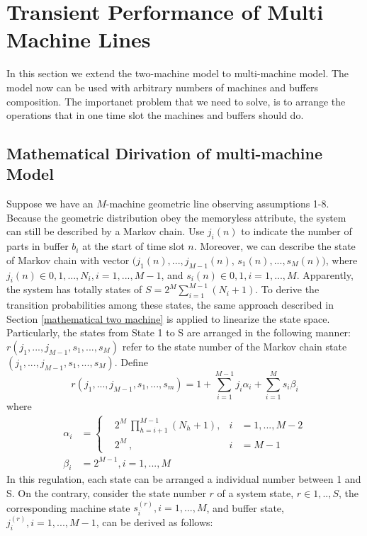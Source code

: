 \section{Transient Performance of Multi Machine Lines}
\noindent In this section we extend the two-machine model to multi-machine model. The model now can be used with arbitrary numbers of machines and buffers composition. The importanet problem that we need to solve, is to arrange the operations that in one time slot the machines and buffers should do.

\subsection{Mathematical Dirivation of multi-machine Model}
\noindent Suppose we have an $M$-machine geometric line observing assumptions 1-8. Because the geometric distribution obey the memoryless attribute, the system can still be described by a Markov chain. Use $j_i(n)$ to indicate the number of parts in buffer $b_i$ at the start of time slot $n$. Moreover, we can describe the state of Markov chain with vector $(j_1(n), ... , j_{M-1}(n)$, $ s_1(n), ..., s_M(n))$, where $j_i(n) \in {0, 1, ...,N_i}, i = 1, ..., M-1$, and $s_i(n) \in {0, 1}, i = 1, ..., M$. Apparently, the system has totally states of $S = 2^M \sum^{M-1}_{i=1} (N_i + 1)$. To derive the transition probabilities among these states, the same approach described in Section \ref{mathematical two machine} is applied to linearize the state space. Particularly, the states from State 1 to S are arranged in the following manner: $r(j_1, ..., j_{M-1}, s_1, ..., s_M)$ refer to the state number of the Markov chain state $(j_1, ..., j_{M-1}, s_1, ..., s_M)$. Define
\begin{equation}
    r(j_1,...,j_{M-1},s_1,...,s_m) = 1+\sum^{M-1}_{i=1}j_i\alpha _i + \sum^M_{i=1}s_i\beta _i
    \label{multimachine r}
\end{equation}
where
\begin{align*}
    \alpha_i &= \left\{ 
      \begin{aligned} &2^M \ \prod^{M-1}_{h=i+1}(N_h + 1),  &i &= 1,...,M-2 \\ &2^M \ , &i &= M-1 
      \end{aligned}
    \right. 
    \\ \beta _i &= 2^{M-1}, i = 1,...,M
  \end{align*}
  In this regulation, each state can be arranged a individual number between 1 and S. On the contrary, consider the state number $r$ of a system state, $r\in{1, .., S}$, the corresponding machine state $s^{(r)}_i ,  i = 1, ..., M$, and buffer state, $j^{(r)}_i , i = 1,..., M-1$, can be derived as follows:

